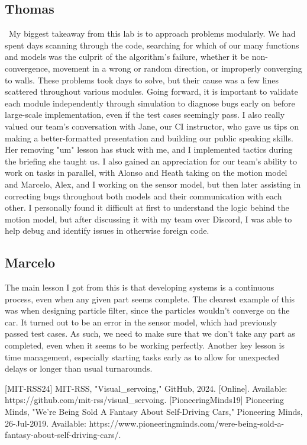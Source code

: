 \documentclass{article}
\begin{document}
\subsection{Thomas}\
My biggest takeaway from this lab is to approach problems modularly. We had spent days scanning through the code, searching for which of our many functions and models was the culprit of the algorithm's failure, whether it be non-convergence, movement in a wrong or random direction, or improperly converging to walls. These problems took days to solve, but their cause was a few lines scattered throughout various modules. Going forward, it is important to validate each module independently through simulation to diagnose bugs early on before large-scale implementation, even if the test cases seemingly pass. I also really valued our team's conversation with Jane, our CI instructor, who gave us tips on making a better-formatted presentation and building our public speaking skills. Her removing "um" lesson has stuck with me, and I implemented tactics during the briefing she taught us. I also gained an appreciation for our team's ability to work on tasks in parallel, with Alonso and Heath taking on the motion model and Marcelo, Alex, and I working on the sensor model, but then later assisting in correcting bugs throughout both models and their communication with each other. I personally found it difficult at first to understand the logic behind the motion model, but after discussing it with my team over Discord, I was able to help debug and identify issues in otherwise foreign code. 

\subsection{Marcelo}
The main lesson I got from this is that developing systems is a continuous process, even when any given part seems complete. The clearest example of this was when designing particle filter, since the particles wouldn't converge on the car. It turned out to be an error in the sensor model, which had previously passed test cases. As such, we need to make sure that we don't take any part as completed, even when it seems to be working perfectly. Another key lesson is time management, especially starting tasks early as to allow for unexpected delays or longer than usual turnarounds.






[MIT-RSS24] MIT-RSS, "Visual\_servoing," GitHub, 2024. [Online]. Available: https://github.com/mit-rss/visual\_servoing.
\vspace{0.5cm}
[PioneeringMinds19] Pioneering Minds, "We’re Being Sold A Fantasy About Self-Driving Cars," Pioneering Minds, 26-Jul-2019. Available: https://www.pioneeringminds.com/were-being-sold-a-fantasy-about-self-driving-cars/.
\end{document}

